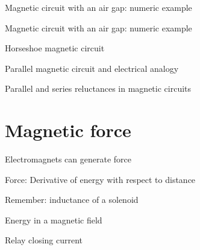 \documentclass[compress]{beamer}
\begin{document}
{
    \begin{frame}{Magnetic circuit with an air gap: numeric example}
    \end{frame}
}

{
    \begin{frame}{Magnetic circuit with an air gap: numeric example}
    \end{frame}
}

{
    \begin{frame}{Horseshoe magnetic circuit}
    \end{frame}
}

{
    \begin{frame}{Parallel magnetic circuit and electrical analogy}
    \end{frame}
}

{
    \begin{frame}{Parallel and series reluctances in magnetic circuits}
    \end{frame}
}

\section{Magnetic force}

{
    \begin{frame}{Electromagnets can generate force}
    \end{frame}
}

{
    \begin{frame}{Force: Derivative of energy with respect to distance}
    \end{frame}
}

{
    \begin{frame}{Remember: inductance of a solenoid}
    \end{frame}
}

{
    \begin{frame}{Energy in a magnetic field}
    \end{frame}
}

{
    \begin{frame}{Relay closing current}
    \end{frame}
}
\end{document}
